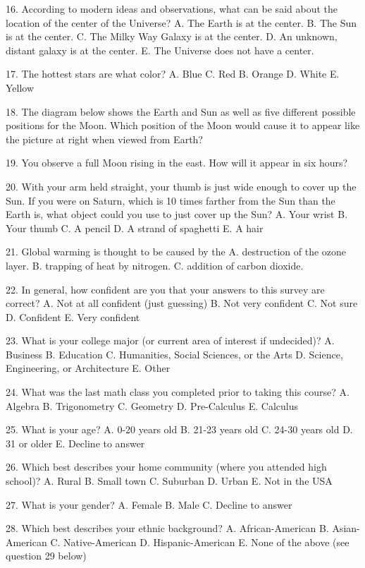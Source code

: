 16. According to modern ideas and observations, what can be said about the location of the
center of the Universe?
A. The Earth is at the center.
B. The Sun is at the center.
C. The Milky Way Galaxy is at the center.
D. An unknown, distant galaxy is at the center.
E. The Universe does not have a center.

17. The hottest stars are what color?
A. Blue
C. Red
B. Orange
D. White
E. Yellow


18. The diagram below shows the Earth and Sun as well as five different possible positions for
the Moon. Which position of the Moon would cause it to appear like the picture at right
when viewed from Earth?

19. You observe a full Moon rising in the east. How will it appear in six hours?

20. With your arm held straight, your thumb is just wide enough to cover up the Sun. If you
were on Saturn, which is 10 times farther from the Sun than the Earth is, what object could
you use to just cover up the Sun?
A. Your wrist
B. Your thumb
C. A pencil
D. A strand of spaghetti
E. A hair

21. Global warming is thought to be caused by the
A. destruction of the ozone layer.
B. trapping of heat by nitrogen.
C. addition of carbon dioxide.

22. In general, how confident are you that your answers to this survey are correct?
A. Not at all confident (just guessing)
B. Not very confident
C. Not sure
D. Confident
E. Very confident


23. What is your college major (or current area of interest if undecided)?
A. Business
B. Education
C. Humanities, Social Sciences, or the Arts
D. Science, Engineering, or Architecture
E. Other

24. What was the last math class you completed prior to taking this course?
A. Algebra
B. Trigonometry
C. Geometry
D. Pre-Calculus
E. Calculus

25. What is your age?
A. 0-20 years old
B. 21-23 years old
C. 24-30 years old
D. 31 or older
E. Decline to answer

26. Which best describes your home community (where you attended high school)?
A. Rural
B. Small town
C. Suburban
D. Urban
E. Not in the USA

27. What is your gender?
A. Female
B. Male
C. Decline to answer

28. Which best describes your ethnic background?
A. African-American
B. Asian-American
C. Native-American
D. Hispanic-American
E. None of the above (see question 29 below)

